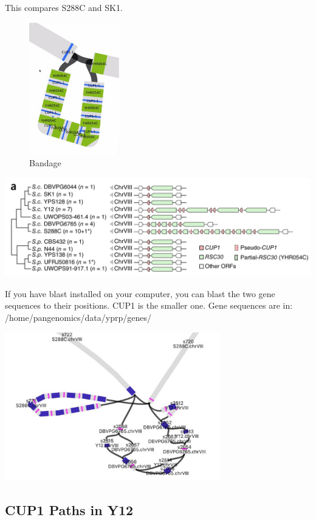 \documentclass[
]{book}
\begin{document}
This compares S288C and SK1.

\begin{figure}
\centering
\includegraphics[width=0.35\textwidth,height=\textheight]{./Figures/Bandage4.png}
\caption{Bandage}
\end{figure}

\includegraphics[width=1\textwidth,height=\textheight]{./Figures/StructuralRearrangements.png}

If you have blast installed on your computer, you can blast the two gene sequences to their positions. CUP1 is the smaller one. Gene sequences are in: /home/pangenomics/data/yprp/genes/

\includegraphics[width=0.7\textwidth,height=\textheight]{./Figures/Bandage5.png}

\hypertarget{cup1-paths-in-y12}{%
\subsection*{CUP1 Paths in Y12}\label{cup1-paths-in-y12}}
\end{document}
